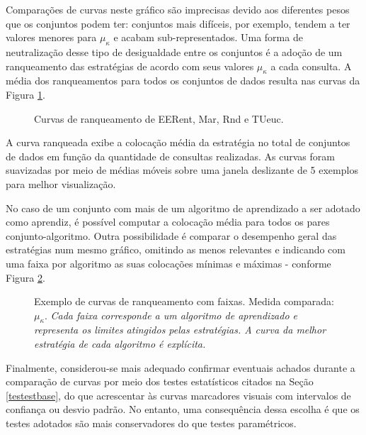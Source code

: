 Comparações de curvas neste gráfico são imprecisas devido aos diferentes pesos que os conjuntos podem ter: conjuntos mais difíceis, por exemplo, tendem a ter valores menores para $\mu_\kappa$ e acabam sub-representados.
Uma forma de neutralização desse tipo de desigualdade entre os conjuntos é a adoção de um ranqueamento das estratégias de acordo com seus valores $\mu_\kappa$ a cada consulta.
A média dos ranqueamentos para todos os conjuntos de dados
resulta nas curvas da Figura \ref{curvasilustraallrank}.
\begin{figure}
	\centering
	
	\caption{Curvas de ranqueamento de EERent, Mar, Rnd e TUeuc.}
	\label{curvasilustraallrank}
\end{figure}
A curva ranqueada exibe a colocação média da estratégia no total de conjuntos de dados em função da quantidade de consultas realizadas.
As curvas foram suavizadas por meio de médias móveis sobre uma janela deslizante de 5 exemplos para melhor visualização.

No caso de um conjunto com mais de um algoritmo de aprendizado a ser adotado como aprendiz, é possível computar a colocação média para todos os pares conjunto-algoritmo.
Outra possibilidade é comparar o desempenho geral das estratégias num mesmo gráfico, omitindo as menos relevantes e indicando com uma faixa por algoritmo as suas colocações mínimas e máximas - conforme Figura \ref{ilustrafaixas}.
\begin{figure}
	\centering
	
	\caption[Exemplo de curvas de ranqueamento com faixas.]{Exemplo de curvas de ranqueamento com faixas. Medida comparada: $\mu_{\kappa}$. \textit{Cada faixa corresponde a um algoritmo de aprendizado e representa os limites atingidos pelas estratégias. A curva da melhor estratégia de cada algoritmo é explícita.}}
	\label{ilustrafaixas}
\end{figure}

Finalmente, considerou-se mais adequado confirmar eventuais achados durante a comparação de curvas por meio dos testes estatísticos citados na Seção \ref{testestbase}, do que acrescentar às curvas marcadores visuais com intervalos de confiança ou desvio padrão.
No entanto, uma consequência dessa escolha é que os testes adotados são mais conservadores do que testes paramétricos.

